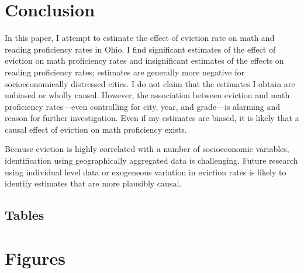 \documentclass[12pt]{article}
\begin{document}
\section{Conclusion} \label{sec:conclusion}
In this paper, I attempt to estimate the effect of eviction rate on math and reading proficiency rates in Ohio. I find significant estimates of the effect of eviction on math proficiency rates and insignificant estimates of the effects on reading proficiency rates; estimates are generally more negative for socioeconomically distressed cities. I do not claim that the estimates I obtain are unbiased or wholly causal. However, the association between eviction and math proficiency rates—even controlling for city, year, and grade—is alarming and reason for further investigation. Even if my estimates are biased, it is likely that a causal effect of eviction on math proficiency exists.

Because eviction is highly correlated with a number of socioeconomic variables, identification using geographically aggregated data is challenging. Future research using individual level data or exogeneous variation in eviction rates is likely to identify estimates that are more plausibly causal.


\singlespacing
\setlength\bibsep{0pt}





\clearpage

\onehalfspacing


\begin{landscape}
\section*{Tables} \label{sec:tab}

\end{landscape}




\newpage
{}
\begin{landscape}

\end{landscape}
\restoregeometry


\clearpage

\section*{Figures} \label{sec:fig}
\end{document}
